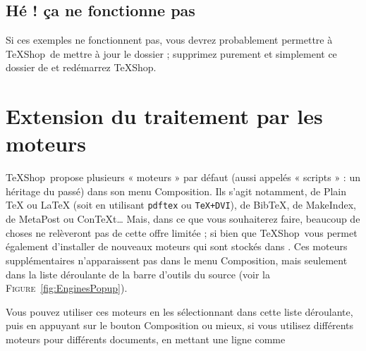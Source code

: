 \documentclass[11pt,french]{article}
\newcommand{\TS}{\textsf{\TeX Shop}}
\newcommand{\mnu}[1]{\textsf{#1}}
\newcommand{\selmark}{\colorbox{green}{\rule[-0.5ex]{0ex}{2.1ex}\texttt{•}}}
\begin{document}

\subsection{Hé ! ça ne fonctionne pas}

Si ces exemples ne fonctionnent pas, vous devrez probablement permettre à \TS\ de mettre à jour le dossier  ; supprimez purement et simplement ce dossier de  et redémarrez \TS.



\section{Extension du traitement par les moteurs}

\TS\ propose plusieurs « moteurs » par défaut (aussi appelés « scripts » : un héritage du passé) dans son menu \mnu{Composition}. Ils s'agit notamment, de \mnu{Plain TeX} ou \mnu{LaTeX} (soit en utilisant \texttt{pdftex} ou \texttt{TeX+DVI}), de \mnu{BibTeX}, de \mnu{MakeIndex}, de \mnu{MetaPost} ou \mnu{ConTeXt}… Mais, dans ce que vous souhaiterez faire, beaucoup de choses ne relèveront pas de cette offre limitée ; si bien que \TS\ vous permet également d'installer de nouveaux moteurs qui sont stockés dans . Ces moteurs supplémentaires n'apparaissent pas dans le menu \mnu{Composition}, mais seulement dans la liste déroulante de la barre d'outils du source (voir la \textsc{Figure}~\vref{fig:EnginesPopup}).

Vous pouvez utiliser ces moteurs en les sélectionnant dans cette liste déroulante, puis en appuyant sur le bouton \mnu{Composition} ou mieux, si vous utilisez différents moteurs pour différents documents, en mettant une ligne comme
\end{document}
